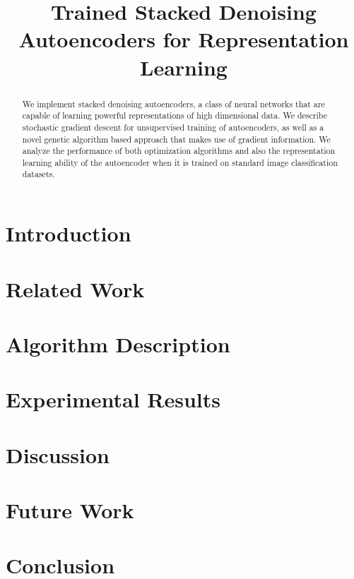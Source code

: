 \documentclass[conference,onecolumn]{IEEEtran}
\begin{document}
\title{Trained Stacked Denoising Autoencoders for Representation Learning}

\author{
\and
{}
}

\maketitle

\begin{abstract}
We implement stacked denoising autoencoders, a class of neural networks that are capable of learning powerful representations of high dimensional data. We describe stochastic gradient descent for unsupervised training of autoencoders, as well as a novel genetic algorithm based approach that makes use of gradient information. We analyze the performance of both optimization algorithms and also the representation learning ability of the autoencoder when it is trained on standard image classification datasets. 
\end{abstract}

\FloatBarrier
\section{Introduction}

\FloatBarrier
\section{Related Work}

\FloatBarrier
\section{Algorithm Description}

\FloatBarrier

\section{Experimental Results}

\section{Discussion}
% 

\section{Future Work}

\section{Conclusion}

\FloatBarrier



\end{document}
